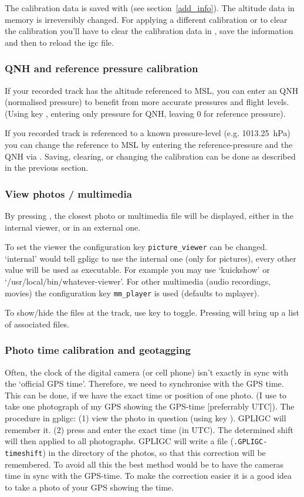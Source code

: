 The calibration data is saved with  (see section~\ref{add_info}).
The altitude data in memory is irreversibly changed. For applying a different calibration or to clear the calibration you'll have to clear the calibration data in
 , save the information and then to reload the igc file.


\subsubsection{QNH and reference pressure calibration}
If your recorded track has the altitude referenced to MSL, you can enter an QNH (normalised pressure) to benefit from more accurate pressures and flight levels.
(Using key , entering only pressure for QNH, leaving 0 for reference pressure).

If you recorded track is referenced to a known pressure-level (e.g. 1013.25~hPa) you can change the reference to MSL by entering the reference-pressure and the QNH via .
Saving, clearing, or changing the calibration can be done as described in the previous section.

\subsubsection{View photos / multimedia}
By pressing , the closest photo or multimedia file will be displayed, either in
the internal viewer, or in an external one.

To set the viewer the configuration key \texttt{picture\_viewer} can be changed. `internal' would tell
gpligc to use the internal one (only for pictures), every other value will be used as executable. For example you may use
`kuickshow' or `/usr/local/bin/whatever-viewer'.
For other multimedia (audio recordings, movies) the configuration key \texttt{mm\_player} is used (defaults to mplayer).

To show/hide the files at the track, use key  to toggle. Pressing  will bring up a list of associated files.

\subsubsection{Photo time calibration and geotagging}
\label{photo_time}
Often, the clock of the digital camera (or cell phone) isn't exactly in sync with the `official GPS time'.
Therefore, we need to synchronise with the GPS time.
This can be done, if we have the exact time or position of one photo.
(I use to take one photograph of my GPS showing the GPS-time [preferrably UTC]).
The procedure in gpligc: (1) view the photo in question (using key ).
GPLIGC will remember it. (2) press  and enter the exact time (in UTC).
The determined shift will then applied to all photographs.
GPLIGC will write a file (\texttt{.GPLIGC-timeshift}) in the directory of the photos, so that this correction will be remembered.
To avoid all this the best method would be to have the cameras time in sync with the GPS-time. To make the correction easier it is a good idea to take a photo of your GPS showing the time.

